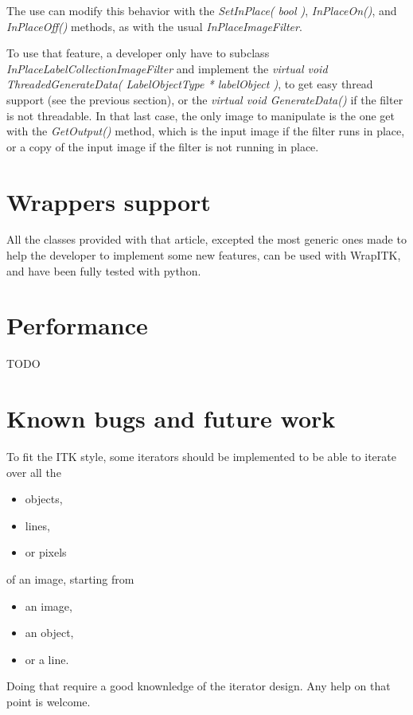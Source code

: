 \documentclass{InsightArticle}
\begin{document}
The use can modify this behavior with the {\em SetInPlace( bool )}, {\em InPlaceOn()}, and {\em InPlaceOff()} methods, as with the usual {\em InPlaceImageFilter}.

To use that feature, a developer only have to subclass {\em InPlaceLabelCollectionImageFilter} and
implement the {\em virtual void ThreadedGenerateData( LabelObjectType * labelObject )}, to get easy thread
support (see the previous section), or the {\em virtual void GenerateData()} if the filter is not threadable. In that last case,
the only image to manipulate is the one get with the {\em GetOutput()} method, which is the input image if the filter runs in place, or a copy of the input image if the filter is not running in place.


\section{Wrappers support}

All the classes provided with that article, excepted the most generic ones made
to help the developer to implement some new features, can be used with WrapITK,
and have been fully tested with python.

\section{Performance}

TODO

\section{Known bugs and future work}

To fit the ITK style, some iterators should be implemented to be able to iterate
over all the 
\begin{itemize}
  \item objects,
  \item lines,
  \item or pixels
\end{itemize}

of an image, starting from 
\begin{itemize}
  \item an image,
  \item an object,
  \item or a line.
\end{itemize}

Doing that require a good knownledge of the iterator design. Any help on that point is
welcome.
\end{document}
